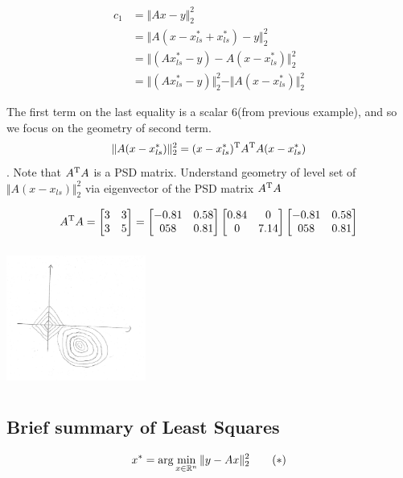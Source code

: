 \begin{align*}
c_1
&=\Vert Ax-y\Vert^2_2\\
&=\Vert A(x-x_{ls}^*+x_{ls}^*)-y\Vert^2_2\\
&=\Vert (Ax_{ls}^*-y)-A(x-x_{ls}^*)\Vert^2_2\\
&=\Vert (Ax_{ls}^*-y)\Vert^2_2 - \Vert A(x-x_{ls}^*)\Vert^2_2
\end{align*}

The first term on the last equality is a scalar 6(from previous example), and so we focus on the geometry of second term.
$$\Vert A(x-x_{ls}^*)\Vert^2_2= (x-x_{ls}^*)^{{\rm T}} A^{{\rm T}}A (x-x_{ls}^*)$$. 
Note that $A^{{\rm T}}A$ is a PSD matrix. Understand geometry of level set of $\Vert A(x-x_{ls})\Vert^2_2$ via eigenvector of the PSD matrix $A^{{\rm T}} A$

$$A^{{\rm T}}A=
\begin{bmatrix}
3&3\\
3&5
\end{bmatrix}
=
\begin{bmatrix}
-0.81&0.58\\
058&0.81
\end{bmatrix}
\begin{bmatrix}
0.84&0\\
0&7.14
\end{bmatrix}
\begin{bmatrix}
-0.81&0.58\\
058&0.81
\end{bmatrix}
$$
\begin{marginfigure}
	\centering
	\includegraphics[width=1.8in,height=1.8in]{figures/ch06/ch06-08.jpg}
\end{marginfigure}


\subsection{Brief summary of Least Squares}
\begin{equation*}
x^* = \arg \min_{x\in \mathbb{R}^n}\Vert y-Ax\Vert_2^2 \qquad (*)
\end{equation*}


